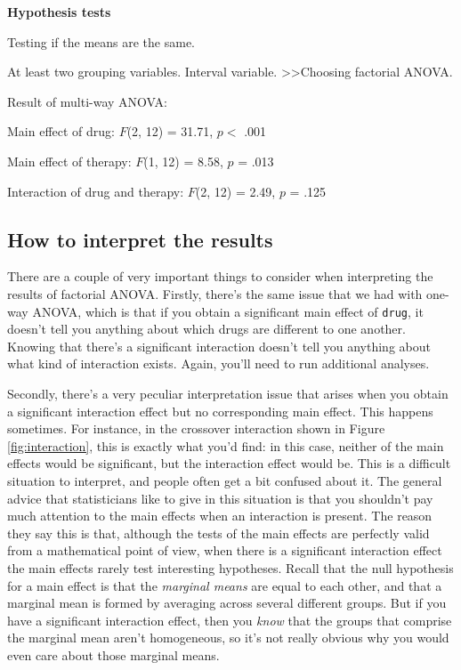 \documentclass[
  11pt,
  a4paper,
  twoside,symmetric,openright]{book}
\theoremstyle{break}
\theoremstyle{break}
\begin{document}
\begin{tcolorbox}[colback=white,
  colframe=lightgray,
  coltext=black,
  boxsep=4pt,
  boxrule=0.3pt,
  arc=0pt]
  {   \sffamily
      \color{CSblue}\textbf{Hypothesis tests}
      
      \color{CSgreen}Testing if the means are the same.
      
      At least two grouping variables. Interval variable. \textgreater\textgreater Choosing factorial ANOVA.

      \color{black}
      Result of multi-way ANOVA:

      Main effect of drug: $F$(2, 12) = 31.71, $p <$ .001

      Main effect of therapy: $F$(1, 12) = 8.58, $p$ = .013

      Interaction of drug and therapy: $F$(2, 12) = 2.49, $p$ = .125
      \normalfont
  }
\end{tcolorbox}

\subsection{How to interpret the results}\label{how-to-interpret-the-results}

There are a couple of very important things to consider when interpreting the results of factorial ANOVA. Firstly, there's the same issue that we had with one-way ANOVA, which is that if you obtain a significant main effect of \texttt{drug}, it doesn't tell you anything about which drugs are different to one another. Knowing that there's a significant interaction doesn't tell you anything about what kind of interaction exists. Again, you'll need to run additional analyses.

Secondly, there's a very peculiar interpretation issue that arises when you obtain a significant interaction effect but no corresponding main effect. This happens sometimes. For instance, in the crossover interaction shown in Figure \ref{fig:interaction}, this is exactly what you'd find: in this case, neither of the main effects would be significant, but the interaction effect would be. This is a difficult situation to interpret, and people often get a bit confused about it. The general advice that statisticians like to give in this situation is that you shouldn't pay much attention to the main effects when an interaction is present. The reason they say this is that, although the tests of the main effects are perfectly valid from a mathematical point of view, when there is a significant interaction effect the main effects rarely test interesting hypotheses. Recall that the null hypothesis for a main effect is that the \emph{marginal means} are equal to each other, and that a marginal mean is formed by averaging across several different groups. But if you have a significant interaction effect, then you \emph{know} that the groups that comprise the marginal mean aren't homogeneous, so it's not really obvious why you would even care about those marginal means.
\end{document}

